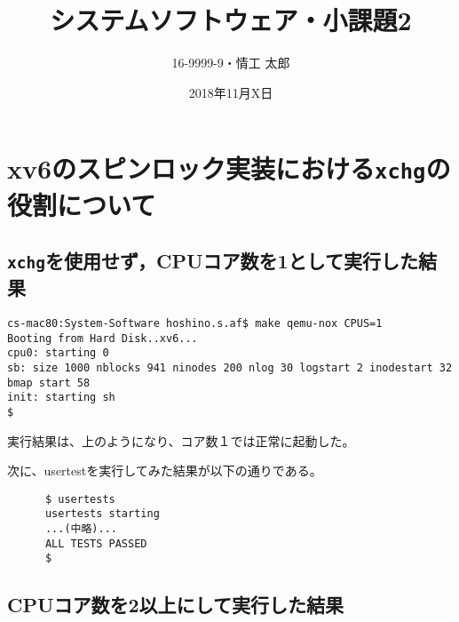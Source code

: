 \documentclass[10pt,a4j]{jarticle}
\title{システムソフトウェア・小課題2}
\author{16-9999-9・情工 太郎}
\date{2018年11月X日}
\begin{document}
\maketitle

\section{xv6のスピンロック実装における\texttt{xchg}の役割について}

\subsection{\texttt{xchg}を使用せず，CPUコア数を1として実行した結果}



\begin{screen}
\begin{verbatim}
cs-mac80:System-Software hoshino.s.af$ make qemu-nox CPUS=1
Booting from Hard Disk..xv6...
cpu0: starting 0
sb: size 1000 nblocks 941 ninodes 200 nlog 30 logstart 2 inodestart 32 bmap start 58
init: starting sh
$
\end{verbatim}
\end{screen}

実行結果は、上のようになり、コア数１では正常に起動した。

次に、usertestを実行してみた結果が以下の通りである。

\begin{screen}
    \begin{verbatim}
      $ usertests
      usertests starting
      ...(中略)...
      ALL TESTS PASSED
      $
    \end{verbatim}
\end{screen}

\subsection{CPUコア数を2以上にして実行した結果}
\end{document}
